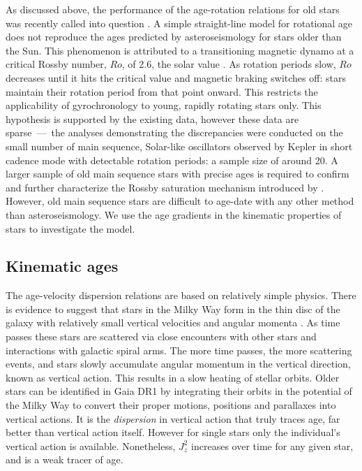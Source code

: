 As discussed above, the performance of the age-rotation relations for old
stars was recently called into question \citep{Angus2015, Vansaders2016,
Metcalfe2016}.
A simple straight-line model for rotational age does not reproduce the ages
predicted by asteroseismology for stars older than the Sun.
This phenomenon is attributed to a transitioning magnetic dynamo at a critical
Rossby number, $Ro$, of 2.6, the solar value \citep{Vansaders2016}.
As rotation periods slow, $Ro$ decreases until it hits the critical value and
magnetic braking switches off: stars maintain their rotation period from that
point onward.
This restricts the applicability of gyrochronology to young, rapidly rotating
stars only.
This hypothesis is supported by the existing data, however these data are
sparse~---~the analyses demonstrating the discrepancies were conducted on the
small number of main sequence, Solar-like oscillators observed by Kepler in
short cadence mode with detectable rotation periods: a sample size of around
20.
A larger sample of old main sequence stars with precise ages is required to
confirm and further characterize the Rossby saturation mechanism introduced by
\citep{Vansaders2016}.
However, old main sequence stars are difficult to age-date with any other
method than asteroseismology.
We use the age gradients in the kinematic properties of stars to investigate
the \citet{Vansaders2016} model.

\subsection{Kinematic ages}
The age-velocity dispersion relations are based on relatively simple physics.
There is evidence to suggest that stars in the Milky Way form in the thin disc
of the galaxy with relatively small vertical velocities and angular momenta
.
As time passes these stars are scattered via close encounters with other
stars and interactions with galactic spiral arms.
The more time passes, the more scattering events, and stars slowly accumulate
angular momentum in the vertical direction, known as vertical action.
This results in a slow heating of stellar orbits.
Older stars can be identified in Gaia DR1 by integrating their orbits in the
potential of the Milky Way to convert their proper motions, positions and
parallaxes into vertical actions.
It is the {\it dispersion} in vertical action that truly traces age, far
better than vertical action itself.
However for single stars only the individual's vertical action is available.
Nonetheless, $J_z^2$ increases over time for any given star, and is a weak
tracer of age.

